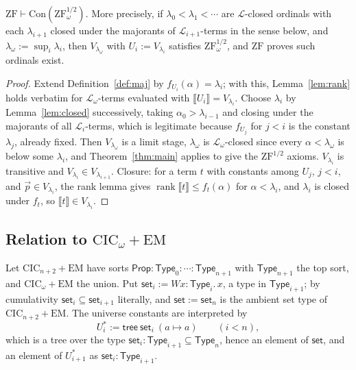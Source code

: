 \documentclass[10pt]{article}
\newcommand{\Prop}{\mathsf{Prop}}
\newcommand{\Type}{\mathsf{Type}}
\newcommand{\CIC}{\mathrm{CIC}}
\newcommand{\ZF}{\mathrm{ZF}}
\newcommand{\ZFh}{\mathrm{ZF}^{1/2}}
\newcommand{\EM}{\mathrm{EM}}
\newcommand{\Con}{\mathrm{Con}}
\newcommand{\rk}{\operatorname{rank}}
\newcommand{\sem}[1]{\llbracket #1\rrbracket}
\newcommand{\Lang}{\mathcal L}
\begin{document}
\begin{theorem}\label{thm:univ}
$\ZF\vdash\Con(\ZFh_\omega)$. More precisely, if $\lambda_0<\lambda_1<\cdots$
are $\Lang$-closed ordinals with each $\lambda_{i+1}$ closed under the
majorants of $\Lang_{i+1}$-terms in the sense below, and
$\lambda_\omega:=\sup_i\lambda_i$, then $V_{\lambda_\omega}$ with
$U_i:=V_{\lambda_i}$ satisfies $\ZFh_\omega$, and $\ZF$ proves such
ordinals exist.
\end{theorem}
\begin{proof}
Extend Definition~\ref{def:maj} by $f_{U_i}(\alpha)=\lambda_i$; with
this, Lemma~\ref{lem:rank} holds verbatim for $\Lang_\omega$-terms
evaluated with $\sem{U_i}=V_{\lambda_i}$. Choose $\lambda_i$ by
Lemma~\ref{lem:closed} successively, taking $\alpha_0>\lambda_{i-1}$
and closing under the majorants of all $\Lang_i$-terms, which is
legitimate because $f_{U_j}$ for $j<i$ is the constant $\lambda_j$,
already fixed. Then $V_{\lambda_\omega}$ is a limit stage,
$\lambda_\omega$ is $\Lang_\omega$-closed since every $\alpha<\lambda_\omega$
is below some $\lambda_i$, and Theorem~\ref{thm:main} applies to give
the $\ZFh$ axioms. $V_{\lambda_i}$ is transitive and
$V_{\lambda_i}\in V_{\lambda_{i+1}}$. Closure: for a term $t$ with
constants among $U_j$, $j<i$, and $\vec p\in V_{\lambda_i}$, the rank
lemma gives $\rk\sem t\le f_t(\alpha)$ for $\alpha<\lambda_i$, and
$\lambda_i$ is closed under $f_t$, so $\sem t\in V_{\lambda_i}$.
\end{proof}

\subsection{Relation to $\CIC_\omega+\EM$}

Let $\CIC_{n+2}+\EM$ have sorts $\Prop:\Type_0:\cdots:\Type_{n+1}$ with
$\Type_{n+1}$ the top sort, and $\CIC_\omega+\EM$ the union. Put
$\mathsf{set}_i:=Wx{:}\Type_i.\,x$, a type in $\Type_{i+1}$; by
cumulativity $\mathsf{set}_i\subseteq\mathsf{set}_{i+1}$ literally, and
$\mathsf{set}:=\mathsf{set}_n$ is the ambient set type of
$\CIC_{n+2}+\EM$. The universe constants are interpreted by
\[
U_i^*:=\mathsf{tree}\ \mathsf{set}_i\ (a\mapsto a)\qquad(i<n),
\]
which is a tree over the type $\mathsf{set}_i:\Type_{i+1}\subseteq\Type_n$,
hence an element of $\mathsf{set}$, and an element of $U_{i+1}^*$ as
$\mathsf{set}_i:\Type_{i+1}$.
\end{document}
